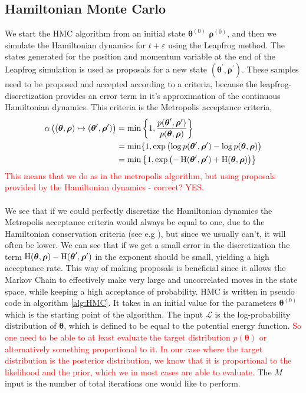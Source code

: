\subsection{Hamiltonian Monte Carlo}
We start the HMC algorithm from an initial state $\boldsymbol{\theta}^{(0)}$ $\boldsymbol{\rho}^{(0)}$, and then we simulate the Hamiltonian dynamics for $t+\varepsilon$ using the Leapfrog method. The states generated for the position and momentum variable at the end of the Leapfrog simulation is used as proposals for a new state $(\boldsymbol{\theta}^\prime,\boldsymbol{\rho}^\prime)$. These samples need to be proposed and accepted according to a criteria, because the leapfrog-discretization provides an error term in it's approximation of the continuous Hamiltonian dynamics. This criteria is the Metropolis acceptance criteria,
\begin{equation*}
\begin{split}
    \alpha\left((\boldsymbol{\theta},\boldsymbol{\rho}) \mapsto (\boldsymbol{\theta}^\prime , \boldsymbol{\rho}^\prime )\right) &= \min\left\{1, \frac{p(\boldsymbol{\theta}^\prime,\boldsymbol{\rho}^\prime)}{p(\boldsymbol{\theta},\boldsymbol{\rho})} \right\}\\
    &= \min\{1,\exp\left(\log p(\boldsymbol{\theta}^\prime,\boldsymbol{\rho}^\prime)- \log p(\boldsymbol{\theta}, \boldsymbol{\rho})  \right)\\
    &= \min \left\{1,\exp\left(-\operatorname{H}(\boldsymbol{\theta}^\prime,\boldsymbol{\rho}^\prime) +\operatorname{H}(\boldsymbol{\theta},\boldsymbol{\rho})\right) \right\}
\end{split}
\end{equation*}
\textcolor{red}{This means that we do as in the metropolis algorithm, but using proposals provided by the Hamiltonian dynamics - correct? YES.}
\\ 
\\
We see that if we could perfectly discretize the Hamiltonian dynamics the Metropolis acceptance criteria would always be equal to one, due to the Hamiltonian conservation criteria (see e.g \cite{neal2012mcmc}), but since we usually can't, it will often be lower. We can see that if we get a small error in the discretization the term  $\operatorname{H}(\boldsymbol{\theta},\boldsymbol{\rho})-\operatorname{H}(\boldsymbol{\theta}^\prime,\boldsymbol{\rho}^\prime)$ in the exponent should be small, yielding a high acceptance rate. This way of making proposals is beneficial since it allows the Markov Chain to effectively make very large and uncorrelated moves in the state space, while keeping a high acceptance of probability. HMC is written in pseudo code in algorithm \ref{alg:HMC}. It takes in an initial value for the parameters $\boldsymbol{\theta}^{(0)}$ which is the starting point of the algorithm. The input $\mathcal{L}$ is the log-probability distribution of $\boldsymbol{\theta}$, which is defined to be equal to the potential energy function. \textcolor{red}{So one need to be able to at least evaluate the target distribution $p(\boldsymbol{\theta})$  or alternatively something proportional to it. In our case where the target distribution is the posterior distribution, we know that it is proportional to the likelihood and the prior, which we in most cases are able to evaluate.} The $M$ input is the number of total iterations one would like to perform.
